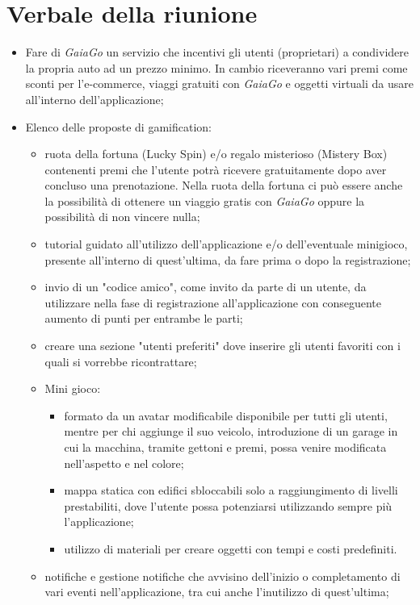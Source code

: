 \section{Verbale della riunione}
\begin{itemize}
	\item Fare di \textit{GaiaGo} un servizio che incentivi gli utenti (proprietari) a condividere la propria auto ad un prezzo minimo. In cambio riceveranno vari premi come sconti per l'e-commerce, viaggi gratuiti con \textit{GaiaGo} e oggetti virtuali da usare all'interno dell'applicazione;
	\item Elenco delle proposte di gamification\glo:
		\begin{itemize}
			\item ruota della fortuna (Lucky Spin) e/o regalo misterioso (Mistery Box) contenenti premi che l'utente potrà ricevere gratuitamente dopo aver concluso una prenotazione. Nella ruota della fortuna ci può essere anche la possibilità di ottenere un viaggio gratis con \textit{GaiaGo} oppure la possibilità di non vincere nulla;
			\item tutorial guidato all'utilizzo dell'applicazione e/o dell'eventuale minigioco, presente all'interno di quest'ultima, da fare prima o dopo la registrazione;
			\item invio di un "codice amico", come invito da parte di un utente, da utilizzare nella fase di registrazione all'applicazione con conseguente aumento di punti per entrambe le parti;
			\item creare una sezione "utenti preferiti" dove inserire gli utenti favoriti con i quali si vorrebbe ricontrattare; 
			\item Mini gioco: 
				\begin{itemize}
					\item formato da un avatar modificabile disponibile per tutti gli utenti, mentre per chi aggiunge il suo veicolo, introduzione di un garage in cui la macchina, tramite gettoni e premi, possa venire modificata nell'aspetto e nel colore;
					\item mappa statica con edifici sbloccabili solo a raggiungimento di livelli prestabiliti, dove l'utente possa potenziarsi utilizzando sempre più l'applicazione;
					\item utilizzo di materiali per creare oggetti con tempi e costi predefiniti. 
				\end{itemize}
			\item notifiche e gestione notifiche che avvisino dell'inizio o completamento di vari eventi nell'applicazione, tra cui anche l'inutilizzo di quest'ultima;

\end{itemize}
\end{itemize}
